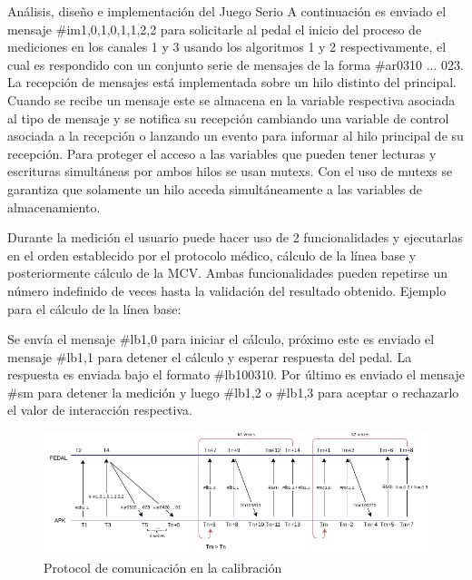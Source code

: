 \begin{thesischapter}{2} {Análisis, diseño e implementación del Juego Serio}
\vspace{10pt}
A continuación es enviado el mensaje \#im1,0,1,0,1,1,2,2 para solicitarle al pedal el inicio del proceso de mediciones en los canales 1 y 3 usando los algoritmos 1 y 2 respectivamente, el cual es respondido con un conjunto serie de mensajes de la forma \#ar0310 ... 023. La recepción de mensajes está implementada sobre un hilo distinto del principal. Cuando se recibe un mensaje este se almacena en la variable respectiva asociada al tipo de mensaje y se notifica su recepción cambiando una variable de control asociada a la recepción o lanzando un evento para informar al hilo principal de su recepción. Para proteger el acceso a las variables que pueden tener lecturas y escrituras simultáneas por ambos hilos se usan mutexs. Con el uso de mutexs se garantiza que solamente un hilo acceda simultáneamente a las variables de almacenamiento. 

    \vspace{10pt}
    Durante la medición el usuario puede hacer uso de 2 funcionalidades y ejecutarlas en el orden establecido por el protocolo médico, cálculo de la línea base y posteriormente cálculo de la MCV. Ambas funcionalidades pueden repetirse un número indefinido de veces hasta la validación del resultado obtenido. Ejemplo para el cálculo de la línea base:
    
    \vspace{10pt}
    Se envía el mensaje \#lb1,0 para iniciar el cálculo, próximo este es enviado el mensaje  \#lb1,1 para 
    detener el cálculo y esperar respuesta del pedal. La respuesta es enviada bajo el formato  \#lb100310. 
    Por último es enviado el mensaje \#sm para detener la medición y luego \#lb1,2 o \#lb1,3 para aceptar 
     o rechazarlo el valor de interacción respectiva.  

    
    \begin{figure}[ht]
        \centering
        \includegraphics[scale=0.58]{images/diagram-protocol-in-calibration.png}
        \caption{Protocol de comunicación en la calibración}
        \label{fig: diagram-protocol-in-calibration}
    \end{figure}


\end{thesischapter}
